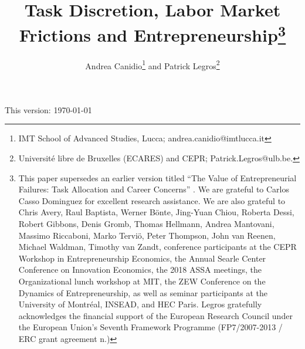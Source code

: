 \documentclass[12pt,american]{paper}
\theoremstyle{remark}
\begin{document}
\title{\vspace*{-3cm} Task Discretion, Labor Market Frictions and Entrepreneurship\footnote{This paper supersedes an earlier version titled ``The Value of Entrepreneurial Failures: Task Allocation and Career Concerns'' \citep{canidio2016}. We are grateful to Carlos Casso Dominguez for excellent research assistance. We are also grateful to Chris Avery, Raul Baptista, Werner B\"onte, Jing-Yuan Chiou, Roberta Dessi, Robert Gibbons, Denis Gromb, Thomas Hellmann, Andrea Mantovani, Massimo Riccaboni, Marko Tervi\"o, Peter Thompson, John van Reenen, Michael Waldman, Timothy van Zandt,  conference participants at the CEPR Workshop in Entrepreneurship Economics,  the Annual Searle Center Conference on Innovation Economics,  the 2018 ASSA meetings, the Organizational lunch workshop at MIT, the ZEW Conference on the Dynamics of Entrepreneurship, as well as seminar participants at the University of Montr\'eal, INSEAD, and HEC Paris. 
Legros gratefully acknowledges the financial support of the European Research Council under the European Union's Seventh Framework Programme (FP7/2007-2013 / ERC grant agreement n.)}
}
\author{Andrea Canidio\thanks{IMT School of Advanced Studies, Lucca; andrea.canidio@imtlucca.it}  and Patrick Legros\thanks{Universit\'e libre de Bruxelles (ECARES) and CEPR; Patrick.Legros@ulb.be.}}

\maketitle 

\noindent This version: \today
\end{document}
